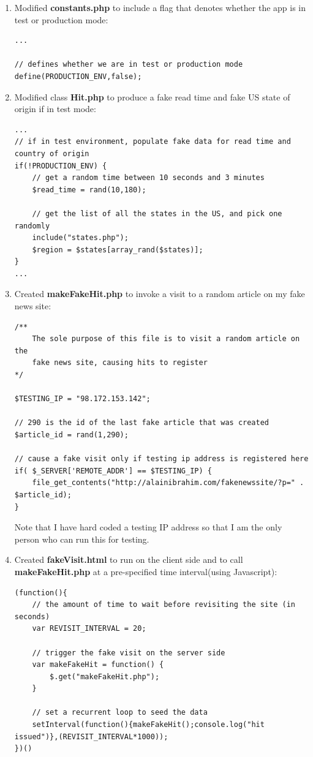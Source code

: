 \documentclass[12pt]{article}
\begin{document}
\begin{enumerate}
\item{Modified \textbf{constants.php} to include a flag that denotes whether the app is in test or production mode:}
\begin{lstlisting}[basicstyle=\scriptsize]
...

// defines whether we are in test or production mode
define(PRODUCTION_ENV,false);
\end{lstlisting}

\item{Modified class \textbf{Hit.php} to produce a fake read time and fake US state of origin if in test mode:}
\begin{lstlisting}[basicstyle=\scriptsize]
...
// if in test environment, populate fake data for read time and country of origin
if(!PRODUCTION_ENV) {
	// get a random time between 10 seconds and 3 minutes
	$read_time = rand(10,180);
	
	// get the list of all the states in the US, and pick one randomly
	include("states.php");
	$region = $states[array_rand($states)];
}
...
\end{lstlisting}
\item{Created \textbf{makeFakeHit.php} to invoke a visit to a random article on my fake news site:}
\begin{lstlisting}[basicstyle=\scriptsize]
/**
	The sole purpose of this file is to visit a random article on the 
	fake news site, causing hits to register
*/

$TESTING_IP = "98.172.153.142";

// 290 is the id of the last fake article that was created
$article_id = rand(1,290);

// cause a fake visit only if testing ip address is registered here
if( $_SERVER['REMOTE_ADDR'] == $TESTING_IP) {
	file_get_contents("http://alainibrahim.com/fakenewssite/?p=" . $article_id);
}
\end{lstlisting}
Note that I have hard coded a testing IP address so that I am the only person who can run this for testing.
\item{Created \textbf{fakeVisit.html} to run on the client side and to call \textbf{makeFakeHit.php} at a pre-specified time interval(using Javascript):}
\begin{lstlisting}[basicstyle=\scriptsize]
(function(){
	// the amount of time to wait before revisiting the site (in seconds)
	var REVISIT_INTERVAL = 20;

	// trigger the fake visit on the server side
	var makeFakeHit = function() {
		$.get("makeFakeHit.php");
	}
	
	// set a recurrent loop to seed the data
	setInterval(function(){makeFakeHit();console.log("hit issued")},(REVISIT_INTERVAL*1000));
})()
\end{lstlisting}
\end{enumerate}
\end{document}
